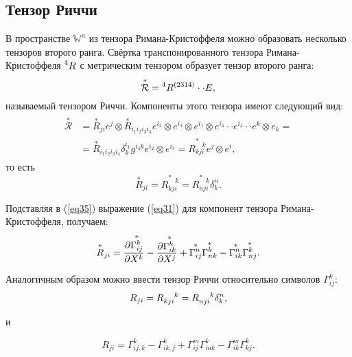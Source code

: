 \documentclass[14pt,a4paper]{extarticle}
\begin{document}
\subsection{Тензор Риччи}
В пространстве $\mathbb{W}^n$ из тензора Римана-Кристоффеля можно образовать несколько тензоров второго ранга. Свёртка транспонированного тензора Римана-Кристоффеля $\prescript{4}{}{R}$ с метрическим тензором образует тензор второго ранга:
\begin{equation}\label{eq33}
	\overset{*}{\mathcal{R}} = \prescript{4}{}{R}^{(2314)} \cdot \cdot E,
\end{equation}
называемый тензором Риччи. Компоненты этого тензора имеют следующий вид:
\begin{align}\label{eq34}
\begin{split}
	\overset{*}{\mathcal{R}} &= \overset{*}{R}_{ji}e^j \otimes \overset{*}{R}_{i_1i_2i_3i_4} e^{i_2} \otimes e^{i_3} \otimes e^{i_1} \otimes e^{i_4} \cdot \cdot e^{i_4} \cdot \cdot e^k \otimes e_k = \\
	&= \overset{*}{R}_{i_1i_2i_3i_4} \delta_k^{i_1}g^{i_4k}e^{i_2} \otimes e^{i_3} = \overset{*}{R_{kji}^{\quad k}} e^j \otimes e^i,
\end{split}
\end{align}
то есть
\begin{equation}\label{eq35}
	\overset{*}{R}_{ji} = \overset{*}{R_{kji}^{\quad k}} = \overset{*}{R_{nji}^{\quad k}}  \delta_k^n.
\end{equation}


Подставляя в (\ref{eq35}) выражение (\ref{eq31}) для компонент тензора Римана-Кристоффеля, получаем:
\begin{equation}\label{eq36}
	\overset{*}{R}_{ji} = \pdv{\overset{*}{\Gamma_{ij}^k}}{X^k} - \pdv{\overset{*}{\Gamma_{ik}^k}}{X^j} + \overset{*}{\Gamma_{ij}^n} \overset{*}{\Gamma_{nk}^k} - \overset{*}{\Gamma_{ik}^n} \overset{*}{\Gamma_{nj}^k}.
\end{equation}


Аналогичным образом можно ввести тензор Риччи относительно символов $\Gamma_{ij}^k$:
\begin{equation}\label{eq37}
	R_{ji} = R\indices{_{kji}^k} = R\indices{_{nji}^k} \delta_k^n,
\end{equation}

и

\begin{equation}\label{eq38}
	R_{ji} = \Gamma_{ij,k}^k - \Gamma_{ik,j}^k + \Gamma_{ij}^m \Gamma_{mk}^k - \Gamma_{ik}^m \Gamma_{kj}^k.
\end{equation}
\end{document}
